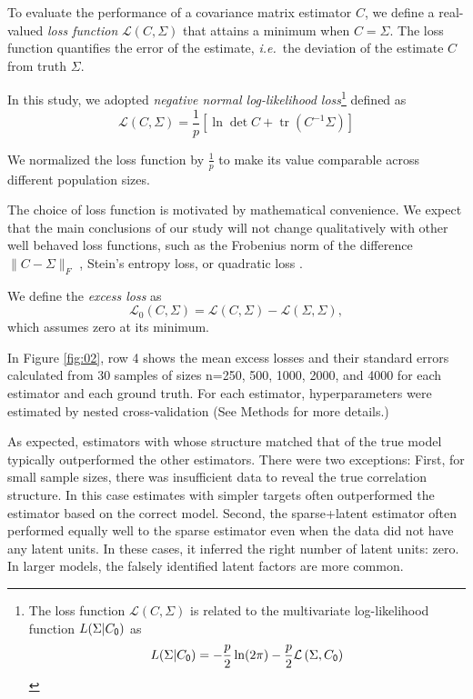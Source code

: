 \documentclass[10pt]{article}
\DeclareMathOperator{\Tr}{tr}
\newcommand{\loss}[1]{\mathcal L\left(#1\right)}
\newcommand{\eloss}[1]{\mathcal L_0\left(#1\right)}
\begin{document}
To evaluate the performance of a covariance matrix estimator $C$, we define a real-valued \emph{loss function} $\loss{C,\Sigma}$ that attains a minimum when $C=\Sigma$.  The loss function quantifies the error of the estimate, \emph{i.e.}~the deviation of the estimate $C$ from truth $\Sigma$.

In this study, we adopted \emph{negative normal log-likelihood loss}\footnote{
The loss function $\loss{C,\Sigma}$ is related to the multivariate log-likelihood function $L(\Sigma|C_{\sf 0})$ as
\begin{equation*}
    L(\Sigma|C_{\sf 0}) = -\frac p 2 \ln(2\pi) -\frac p 2 \loss{\Sigma,C_{\sf 0}}
\end{equation*}
}
defined as
\begin{equation}\label{eq:loss}
    \loss{C,\Sigma} = \frac 1 p\left[\ln \det C + \Tr(C^{-1}\Sigma)\right]
\end{equation}

We normalized the loss function by $\frac 1 p$ to make its value comparable across different population sizes. 

The choice of loss function is motivated by mathematical convenience. We expect that the main conclusions of our study will not change qualitatively with other well behaved loss functions, such as the Frobenius norm of the difference $\|C-\Sigma\|_F$ \cite{Ledoit:2004,Schafer:2005}, Stein's entropy loss, or quadratic loss \cite{James:1961,Fan:2008}.  

We define the \emph{excess loss} as
\begin{equation}\label{eq:excess-loss}
    \eloss{C,\Sigma} = \loss{C,\Sigma}-\loss{\Sigma,\Sigma},
\end{equation}
which assumes zero at its minimum. 

In Figure \ref{fig:02}, row 4 shows the mean excess losses and their standard errors calculated from 30 samples of sizes n=250, 500, 1000, 2000, and 4000 for each estimator and each ground truth. For each estimator, hyperparameters were estimated by nested cross-validation (See Methods for more details.)

As expected, estimators with whose structure matched that of the true model typically outperformed the other estimators. There were two exceptions: First, for small sample sizes, there was insufficient data to reveal the true correlation structure. In this case estimates with simpler targets often outperformed the estimator based on the correct model. Second, the sparse+latent estimator often performed equally well to the sparse estimator even when the data did not have any latent units.  In these cases, it inferred the right number of latent units: zero. In larger models, the falsely identified latent factors are more common.
\end{document}
